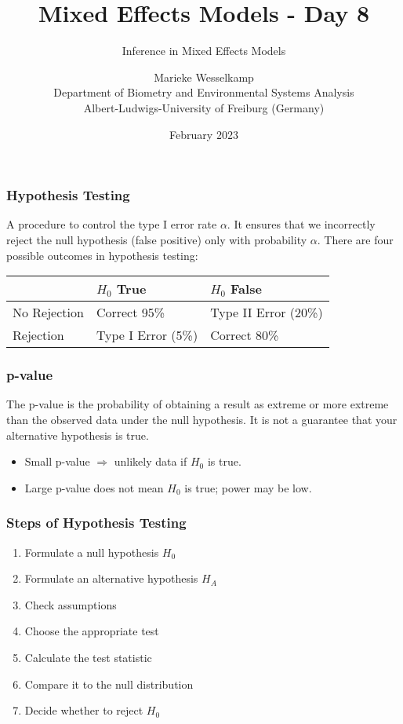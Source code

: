 \documentclass{beamer}
\title{Mixed Effects Models - Day 8}
\subtitle{Inference in Mixed Effects Models}
\author{Marieke Wesselkamp\\Department of Biometry and Environmental Systems Analysis\\Albert-Ludwigs-University of Freiburg (Germany)}
\date{February 2023}
\begin{document}
\frame{\titlepage}

\begin{frame}
    \frametitle{Hypothesis Testing}
    A procedure to control the type I error rate $\alpha$. It ensures that we incorrectly reject the null hypothesis (false positive) only with probability $\alpha$. There are four possible outcomes in hypothesis testing:
    
    \begin{table}[]
    \begin{tabular}{l|l|l}
    \textbf{} & \textbf{$H_0$ True} & \textbf{$H_0$ False} \\
    \hline
    No Rejection & Correct 95\% & Type II Error (20\%) \\
    Rejection & Type I Error (5\%) & Correct 80\%
    \end{tabular}
    \end{table}
\end{frame}

\begin{frame}
    \frametitle{p-value}
    The p-value is the probability of obtaining a result as extreme or more extreme than the observed data under the null hypothesis. It is not a guarantee that your alternative hypothesis is true.
    
    \begin{itemize}
        \item Small p-value $\Rightarrow$ unlikely data if $H_0$ is true.
        \item Large p-value does not mean $H_0$ is true; power may be low.
    \end{itemize}
\end{frame}

\begin{frame}
    \frametitle{Steps of Hypothesis Testing}
    \begin{enumerate}
        \item Formulate a null hypothesis $H_0$
        \item Formulate an alternative hypothesis $H_A$
        \item Check assumptions
        \item Choose the appropriate test
        \item Calculate the test statistic
        \item Compare it to the null distribution
        \item Decide whether to reject $H_0$
    \end{enumerate}
\end{frame}
\end{document}
